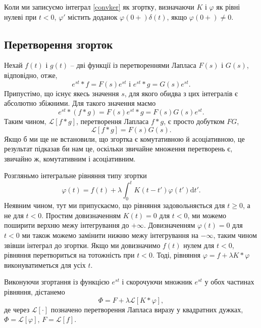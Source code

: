 \documentclass[14pt,twoside]{extreport}
\theoremstyle{mystyle}
\numberwithin{equation}{chapter}
\begin{document}
Коли ми записуємо інтеграл \eqref{convker} як згортку, визначаючи $K$ і $\varphi$ як рівні нулеві при $t<0$, $\varphi'$ містить доданок $\varphi(0+)\delta(t)$, якщо $\varphi(0+)\neq 0$.

\subsection{Перетворення згорток}

Нехай $f(t)$ і $g(t)$ -- дві функції із перетвореннями Лапласа $F(s)$ і $G(s)$, відповідно, отже,
\begin{equation*}
	e^{st}*f=F(s)e^{st}\textrm{ і }e^{st}*g=G(s)e^{st}.
\end{equation*}
Припустімо, що існує якесь значення $s$, для якого обидва з цих інтегралів є абсолютно збіжними. Для такого значення маємо
\begin{equation*}
	e^{st}*(f*g)=F(s)e^{st}*g=F(s)G(s)e^{st}.
\end{equation*}
Таким чином, $\mathcal{L}[f*g]$, перетворення Лапласа $f*g$, є просто добутком $FG$,
\begin{equation*}
	\mathcal{L}[f*g]=F(s)G(s).
\end{equation*}
Якщо б ми ще не встановили, що згортка є комутативною й асоціативною, це результат підказав би нам це, оскільки звичайне множення перетворень є, звичайно ж, комутативним і асоціативним.

Розгляньмо інтегральне рівняння типу згортки
\begin{equation*}
	\varphi(t)=f(t)+\displaystyle \lambda \int_{0}^{t}K(t-t')\varphi(t')\mathrm{d}t'.
\end{equation*}
Неявним чином, тут ми припускаємо, що рівняння задовольняється для $t\geqslant 0$, а не для $t<0$. Простим довизначенням $K(t)=0$ для $t<0$, ми можемо поширити верхню межу інтегрування до $+\infty$. Довизначенням $\varphi(t)=0$ для $t<0$ ми також можемо замінити нижню межу інтегрування на $-\infty$, таким чином звівши інтеграл до згортки. Якщо ми довизначимо $f(t)$ нулем для $t<0$, рівняння перетвориться на тотожність при $t<0$. Тоді, рівняння $\varphi=f+\lambda K*\varphi$ виконуватиметься для усіх $t$.

Виконуючи згортання із функцією $e^{st}$ і скорочуючи множник $e^{st}$ у обох частинах рівняння, дістанемо
\begin{equation}
	\Phi=F+\lambda\mathcal{L}[K*\varphi],
\end{equation}
де через $\mathcal{L}[\cdot]$ позначено перетворення Лапласа виразу у квадратних дужках, $\Phi=\mathcal{L}[\varphi]$, $F=\mathcal{L}[f]$.
\end{document}
